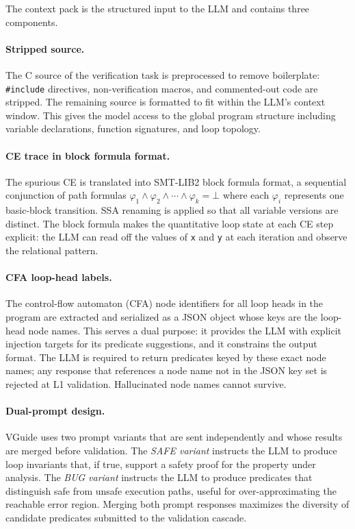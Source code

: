 The context pack is the structured input to the LLM and contains three components.

\paragraph{Stripped source.} The C source of the verification task is preprocessed to
remove boilerplate: \texttt{\#include} directives, non-verification macros, and
commented-out code are stripped. The remaining source is formatted to fit within the
LLM's context window. This gives the model access to the global program structure
including variable declarations, function signatures, and loop topology.

\paragraph{CE trace in block formula format.} The spurious CE is translated into
SMT-LIB2 block formula format, a sequential conjunction of path formulas
$\varphi_1 \wedge \varphi_2 \wedge \cdots \wedge \varphi_k = \bot$ where each
$\varphi_i$ represents one basic-block transition. SSA renaming is applied so that
all variable versions are distinct. The block formula makes the quantitative loop
state at each CE step explicit: the LLM can read off the values of \texttt{x} and
\texttt{y} at each iteration and observe the relational pattern.

\paragraph{CFA loop-head labels.} The control-flow automaton (CFA) node identifiers
for all loop heads in the program are extracted and serialized as a JSON object whose
keys are the loop-head node names. This serves a dual purpose: it provides the LLM
with explicit injection targets for its predicate suggestions, and it constrains the
output format. The LLM is required to return predicates keyed by these exact node
names; any response that references a node name not in the JSON key set is rejected
at L1 validation. Hallucinated node names cannot survive.

\paragraph{Dual-prompt design.} VGuide uses two prompt variants that are sent
independently and whose results are merged before validation. The \emph{SAFE variant}
instructs the LLM to produce loop invariants that, if true, support a safety proof
for the property under analysis. The \emph{BUG variant} instructs the LLM to produce
predicates that distinguish safe from unsafe execution paths, useful for
over-approximating the reachable error region. Merging both prompt responses maximizes
the diversity of candidate predicates submitted to the validation cascade.

